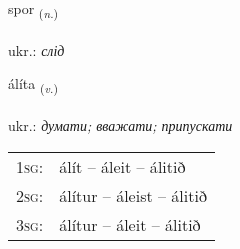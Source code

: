 \documentclass[frontgrid, backgrid]{flacards}\usepackage[]{graphicx}\usepackage[]{xcolor}
\begin{document}
\renewcommand{\flhead}{\vskip5pt \fboxsep=0pt {\small\bfseries\footnotesize Nafnorð | іменник}}
\renewcommand{\fcfoot}{\vskip5pt \fboxsep=0pt \hspace{2pt}{\small\bfseries\footnotesize 2K}}

\renewcommand{\blhead}{\vskip5pt {\small\bfseries\footnotesize Nafnorð | іменник }}
\renewcommand{\bcfoot}{\vskip5pt \hspace{2pt}{\small\bfseries\footnotesize 2K}}


{spor \small{\textsubscript{(\textit{n.})}} \\[1ex] %
\textphonetic{[spɔːr]} \\
ukr.: \emph{слід} \\  [2ex]
\renewcommand*{\arraystretch}{0.8}
}

\renewcommand{\flhead}{\vskip5pt \fboxsep=0pt {\small\bfseries\footnotesize Sagnorð | дієслово}}
\renewcommand{\fcfoot}{\vskip5pt \fboxsep=0pt \hspace{2pt}{\small\bfseries\footnotesize 2K}}

\renewcommand{\blhead}{\vskip5pt {\small\bfseries\footnotesize Sagnorð | дієслово }}
\renewcommand{\bcfoot}{\vskip5pt \hspace{2pt}{\small\bfseries\footnotesize 2K}}


{álíta \small{\textsubscript{(\textit{v.})}} \\[1ex] %
\textphonetic{[auːlita]} \\
ukr.: \emph{думати; вважати; припускати} \\  [2ex]
\renewcommand*{\arraystretch}{0.8}
\begin{tabular}{p{1cm}l}
\textsc{1sg}: & álít -- áleit -- álitið \\ 
\textsc{2sg}: & álítur -- áleist -- álitið \\ 
\textsc{3sg}: & álítur -- áleit -- álitið \\ 
\end{tabular}
}
\end{document}
